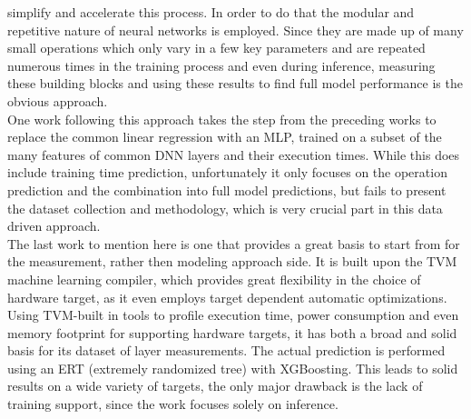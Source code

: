 simplify and accelerate this process. In order to do that the modular and repetitive nature of neural
networks is employed. Since they are made up of many small operations which only vary in a few key
parameters and are repeated numerous times in the training process and even during inference, measuring
these building blocks and using these results to find full model performance is the obvious approach.\\
One work following this approach takes the step from the preceding works to replace the common linear
regression with an MLP, trained on a subset of the many features of common DNN layers
and their execution times. While this does include training time prediction, unfortunately it only
focuses on the operation prediction and the combination into full model predictions, but fails to 
present the dataset collection and methodology, which is very crucial part in this data driven approach.\\
The last work to mention here is one that provides a great basis to start from for the measurement,
rather then modeling approach side. It is built upon the TVM machine learning compiler, which provides
great flexibility in the choice of hardware target, as it even employs target dependent automatic 
optimizations. Using TVM-built in tools to profile execution time, power consumption and even memory
footprint for supporting hardware targets, it has both a broad and solid basis for its dataset of 
layer measurements. The actual prediction is performed using an ERT (extremely randomized tree) with XGBoosting.
This leads to solid results on a wide variety of targets, the only major drawback is the lack of training 
support, since the work focuses solely on inference.\\


